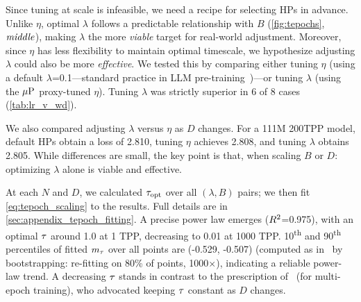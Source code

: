 


Since tuning at scale is infeasible, we need a recipe for selecting
HPs in advance.  Unlike $\eta$, optimal $\lambda$ follows a
predictable relationship with $B$ (\cref{fig:tepochs}, $\text{\emph{middle}}$),
making $\lambda$ the more \emph{viable} target for real-world
adjustment.
%
Moreover, since $\eta$ has less flexibility to maintain optimal
timescale, we hypothesize adjusting $\lambda$ could also be
more \emph{effective}.
%
We tested this by comparing either tuning $\eta$ (using a default
$\lambda$=0.1---standard practice in LLM
pre-training~\citep{hoffmann2022empirical,brown2020language,almazrouei2023falcon,alephalpha2024introducing})---or
tuning $\lambda$ (using the $\mbox{$\mu$P}$ proxy-tuned $\eta$).
%
Tuning $\lambda$ was strictly superior in 6 of 8 cases (\cref{tab:lr_v_wd}).
%
%

We also compared adjusting $\lambda$ versus $\eta$ as $D$ changes.
For a 111M 200TPP model, default HPs obtain a loss of 2.810, tuning
$\eta$ achieves 2.808, and tuning $\lambda$ obtains 2.805.  While
differences are small, the key point is that, when scaling $B$ or $D$:
optimizing $\lambda$ alone is viable and effective.


At each $N$ and $D$, we calculated ${\tau}_{\text{opt}}$ over all $(\lambda,
B)$ pairs; we then fit \cref{eq:tepoch_scaling} to the results.
%
Full details are in \cref{sec:appendix_tepoch_fitting}.
%
A precise power law emerges ($R^{2}$=0.975), with an optimal
$\tau$ around 1.0 at 1 TPP, decreasing to 0.01 at 1000 TPP\@.
%
10\textsuperscript{th} and 90\textsuperscript{th} percentiles of
fitted $m_{\tau}$ over all points are (-0.529, -0.507) (computed as
in~\citet{hoffmann2022empirical} by bootstrapping: re-fitting on 80\%
of points, 1000$\times$), indicating a reliable power-law trend.
%
A decreasing $\tau$ stands in contrast to the prescription
of~\citet{wang2024how} (for multi-epoch training), who advocated
keeping $\tau$ constant as $D$ changes.

